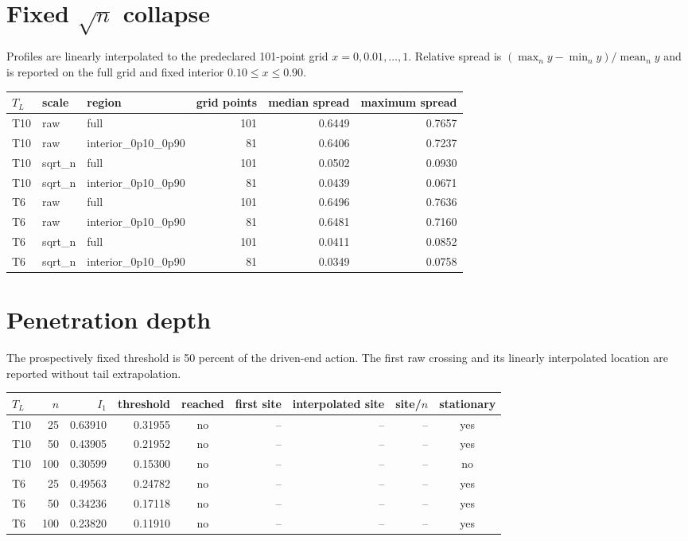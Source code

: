 \documentclass[10pt]{article}
\begin{document}
\section{Fixed $\sqrt{n}$ collapse}
Profiles are linearly interpolated to the predeclared 101-point grid
$x=0,0.01,\ldots,1$.  Relative spread is
$(\max_n y-\min_n y)/\operatorname{mean}_n y$ and is reported on the full
grid and fixed interior $0.10\le x\le0.90$.

\scriptsize
\begin{longtable}{l l l r r r}
\toprule
$T_L$ & scale & region & grid points & median spread & maximum spread\\
\midrule
\endfirsthead
T10 & raw & full & 101 & 0.6449 & 0.7657 \\
T10 & raw & interior\_0p10\_0p90 & 81 & 0.6406 & 0.7237 \\
T10 & sqrt\_n & full & 101 & 0.0502 & 0.0930 \\
T10 & sqrt\_n & interior\_0p10\_0p90 & 81 & 0.0439 & 0.0671 \\
T6 & raw & full & 101 & 0.6496 & 0.7636 \\
T6 & raw & interior\_0p10\_0p90 & 81 & 0.6481 & 0.7160 \\
T6 & sqrt\_n & full & 101 & 0.0411 & 0.0852 \\
T6 & sqrt\_n & interior\_0p10\_0p90 & 81 & 0.0349 & 0.0758 \\
\bottomrule
\end{longtable}
\normalsize

\section{Penetration depth}
The prospectively fixed threshold is 50 percent of the driven-end action.  The
first raw crossing and its linearly interpolated location are reported without
tail extrapolation.

\scriptsize
\begin{longtable}{l r r r c r r r c}
\toprule
$T_L$ & $n$ & $I_1$ & threshold & reached & first site & interpolated site & site/$n$ & stationary\\
\midrule
\endfirsthead
T10 & 25 & 0.63910 & 0.31955 & no & -- & -- & -- & yes \\
T10 & 50 & 0.43905 & 0.21952 & no & -- & -- & -- & yes \\
T10 & 100 & 0.30599 & 0.15300 & no & -- & -- & -- & no \\
T6 & 25 & 0.49563 & 0.24782 & no & -- & -- & -- & yes \\
T6 & 50 & 0.34236 & 0.17118 & no & -- & -- & -- & yes \\
T6 & 100 & 0.23820 & 0.11910 & no & -- & -- & -- & yes \\
\bottomrule
\end{longtable}
\normalsize
\end{document}
